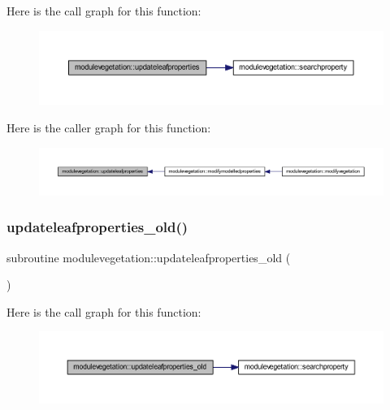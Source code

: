 Here is the call graph for this function\+:\nopagebreak
\begin{figure}[H]
\begin{center}
\leavevmode
\includegraphics[width=350pt]{namespacemodulevegetation_a51955d069f261e54788d0be4185665b4_cgraph}
\end{center}
\end{figure}
Here is the caller graph for this function\+:\nopagebreak
\begin{figure}[H]
\begin{center}
\leavevmode
\includegraphics[width=350pt]{namespacemodulevegetation_a51955d069f261e54788d0be4185665b4_icgraph}
\end{center}
\end{figure}
\mbox{\label{namespacemodulevegetation_a61c0b056617116efb1cc8733f0f1fd09}} 
\subsubsection{\texorpdfstring{updateleafproperties\+\_\+old()}{updateleafproperties\_old()}}
{\footnotesize\ttfamily subroutine modulevegetation\+::updateleafproperties\+\_\+old (\begin{DoxyParamCaption}{ }\end{DoxyParamCaption})\hspace{0.3cm}{\ttfamily [private]}}

Here is the call graph for this function\+:\nopagebreak
\begin{figure}[H]
\begin{center}
\leavevmode
\includegraphics[width=350pt]{namespacemodulevegetation_a61c0b056617116efb1cc8733f0f1fd09_cgraph}
\end{center}
\end{figure}
\mbox{\label{namespacemodulevegetation_a8f770924e5053c42aa7f57b5a6f5be05}} 
